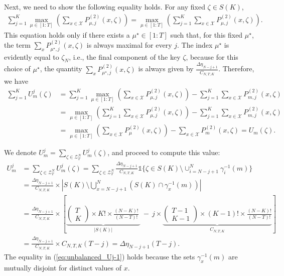 \documentclass[11pt,letterpaper]{article}
\newcommand{\cX}{\mathcal{X}}
\newcommand{\cZ}{\mathcal{Z}}
\begin{document}
Next, we need to show the following equality holds. For any fixed $\zeta \in S(K)$, 
\begin{align}
    \sum_{j = 1}^K \max_{\mu \in [1:T]}\left( \sum_{x \in \cX} P_{\mu,j}^{(2)}(x, \zeta) \right) = \max_{\mu \in [1:T]}\left( \sum_{j = 1}^K \sum_{x \in \cX} P_{\mu,j}^{(2)}(x, \zeta) \right). 
\end{align}
This equation holds only if there exists a $\mu^{\star} \in [1:T]$ such that, for this fixed $\mu^{\star}$, the term $\sum_x P_{\mu^{\star},j}^{(2)}(x, \zeta)$ is always maximal for every $j$. The index $\mu^{\star}$ is evidently equal to $\zeta_N$, i.e., the final component of the key $\zeta$, because for this choice of $\mu^{\star}$, the quantity $\sum_x P_{\mu^{\star},j}^{(2)}(x, \zeta)$ is always given by $\tfrac{\Delta\eta_{N-j+1}}{C_{N,T,K}}$. Therefore, we have
\begin{align}
    \sum_{j=1}^K U^j_m(\zeta) & = \sum_{j = 1}^K \max_{\mu \in [1:T]}\left( \sum_{x \in \cX} P_{\mu,j}^{(2)}(x, \zeta) \right) - \sum_{j=1}^K \sum_{x \in \cX} P_{m,j}^{(2)}(x, \zeta) \\
    & = \max_{\mu \in [1:T]}\left( \sum_{j = 1}^K \sum_{x \in \cX} P_{\mu,j}^{(2)}(x, \zeta) \right) - \sum_{j=1}^K \sum_{x \in \cX} P_{m,j}^{(2)}(x, \zeta) \\
    & = \max_{\mu \in [1:T]}\left(\sum_{x \in \cX} P_{\mu}^{(2)}(x, \zeta) \right) - \sum_{x \in \cX} P_{m}^{(2)}(x, \zeta) = U_m(\zeta).
\end{align}

We denote $U^j_m = \sum_{\zeta \in \cZ^N_T} U^j_m(\zeta)$, and proceed to compute this value: 
\begin{align}
    U^j_m & = \sum_{\zeta \in \cZ^N_T} U^j_m(\zeta) = \sum_{\zeta \in \cZ^N_T}  \frac{\Delta\eta_{N-j+1}}{C_{N,T,K}} \mathds{1} \{ \zeta \in S(K) \setminus \cup_{i = N-j+1}^N \gamma_i^{-1}(m) \} \\
    & = \frac{\Delta\eta_{N-j+1}}{C_{N,T,K}} \times  \left| S(K) \setminus \bigcup^{N}_{x=N-j+1} \left(S(K) \cap \gamma_x^{-1}(m) \right) \right| \label{eq:unbalanced_Uj-0} \\
    & =  \frac{\Delta\eta_{N-j+1}}{C_{N,T,K}}\times\left[ \underbrace{\left( \begin{gathered}T\\ K \end{gathered} \right)  \times K!\times \frac{(N-K)!}{(N-T)!} \  }_{\left| S(K)\right|  } \  -\  j \times \underbrace{\left( \begin{gathered}T-1\\ K-1\end{gathered} \right)  \times (K-1)!\times \frac{(N-K)!}{(N-T)!} }_{C_{N,T,K}  } \right]  \label{eq:unbalanced_Uj-1}  \\
    & =  \frac{\Delta\eta_{N-j+1}}{C_{N,T,K}}\times C_{N,T,K}(T-j) = \Delta\eta_{N-j+1}(T-j) \label{eq:unbalanced_Uj-2}.
\end{align}
The equality in (\ref{eq:unbalanced_Uj-1}) holds because the sets $\gamma_x^{-1}(m)$ are mutually disjoint for distinct values of $x$. 
\end{document}
